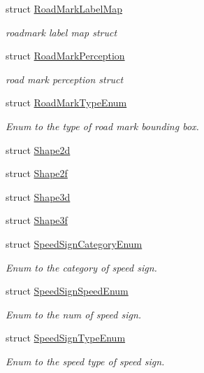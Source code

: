 \begin{DoxyCompactItemize}
struct \hyperlink{structmaf__perception__interface_1_1RoadMarkLabelMap}{Road\+Mark\+Label\+Map}
\begin{DoxyCompactList}\small\item\em roadmark label map struct \end{DoxyCompactList}\item 
struct \hyperlink{structmaf__perception__interface_1_1RoadMarkPerception}{Road\+Mark\+Perception}
\begin{DoxyCompactList}\small\item\em road mark perception struct \end{DoxyCompactList}\item 
struct \hyperlink{structmaf__perception__interface_1_1RoadMarkTypeEnum}{Road\+Mark\+Type\+Enum}
\begin{DoxyCompactList}\small\item\em Enum to the type of road mark bounding box. \end{DoxyCompactList}\item 
struct \hyperlink{structmaf__perception__interface_1_1Shape2d}{Shape2d}
\item 
struct \hyperlink{structmaf__perception__interface_1_1Shape2f}{Shape2f}
\item 
struct \hyperlink{structmaf__perception__interface_1_1Shape3d}{Shape3d}
\item 
struct \hyperlink{structmaf__perception__interface_1_1Shape3f}{Shape3f}
\item 
struct \hyperlink{structmaf__perception__interface_1_1SpeedSignCategoryEnum}{Speed\+Sign\+Category\+Enum}
\begin{DoxyCompactList}\small\item\em Enum to the category of speed sign. \end{DoxyCompactList}\item 
struct \hyperlink{structmaf__perception__interface_1_1SpeedSignSpeedEnum}{Speed\+Sign\+Speed\+Enum}
\begin{DoxyCompactList}\small\item\em Enum to the num of speed sign. \end{DoxyCompactList}\item 
struct \hyperlink{structmaf__perception__interface_1_1SpeedSignTypeEnum}{Speed\+Sign\+Type\+Enum}
\begin{DoxyCompactList}\small\item\em Enum to the speed type of speed sign. \end{DoxyCompactList}\item 

\end{DoxyCompactItemize}
